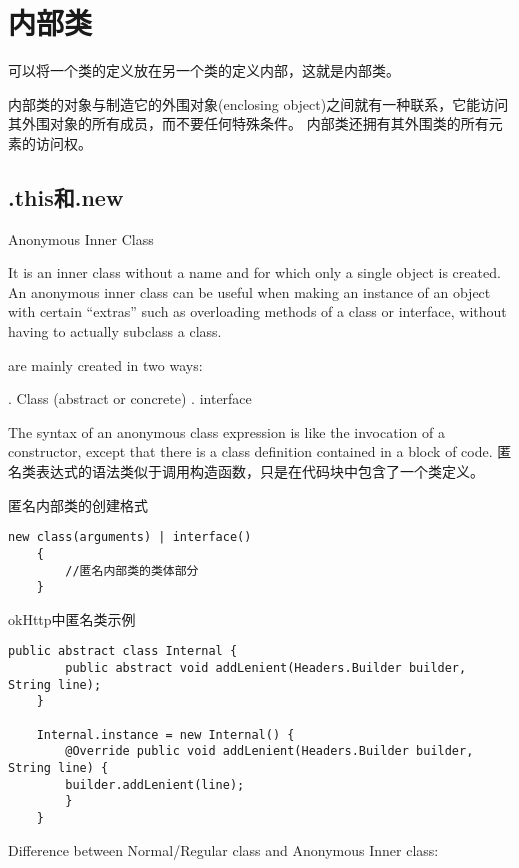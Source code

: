 \chapter{内部类}
\label{chap:inner_class}

可以将一个类的定义放在另一个类的定义内部，这就是内部类。

内部类的对象与制造它的外围对象(enclosing object)之间就有一种联系，它能访问其外围对象的所有成员，而不要任何特殊条件。
内部类还拥有其外围类的所有元素的访问权。


\section{.this和.new}




Anonymous Inner Class

It is an inner class without a name and for which only a single object is created.
An anonymous inner class can be useful when making an instance of an object with certain “extras” such as overloading methods of a class or interface, without having to actually subclass a class.


are mainly created in two ways:

. Class (abstract or concrete)
. interface

The syntax of an anonymous class expression is like the invocation of a constructor, except that there is a class definition contained in a block of code.
匿名类表达式的语法类似于调用构造函数，只是在代码块中包含了一个类定义。

匿名内部类的创建格式

\begin{lstlisting}[style=cjava]
    new class(arguments) | interface()
    {
        //匿名内部类的类体部分
    }
\end{lstlisting}

okHttp中匿名类示例

\begin{lstlisting}[style=cjava]
    public abstract class Internal {
        public abstract void addLenient(Headers.Builder builder, String line);
    }

    Internal.instance = new Internal() {
        @Override public void addLenient(Headers.Builder builder, String line) {
        builder.addLenient(line);
        }
    }
\end{lstlisting}


Difference between Normal/Regular class and Anonymous Inner class:

